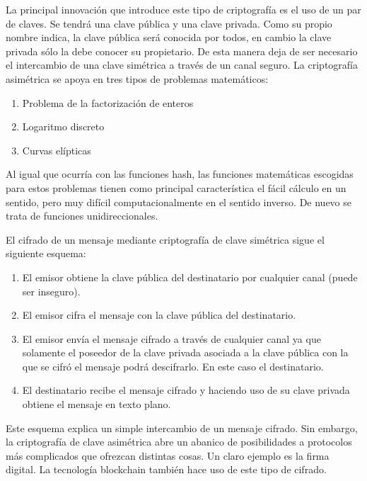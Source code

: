 La principal innovación que introduce este tipo de criptografía es el uso de un par de claves. Se tendrá una clave pública y una clave privada. Como su propio nombre indica, la clave pública será conocida por todos, en cambio la clave privada sólo la debe conocer su propietario. De esta manera deja de ser necesario el intercambio de una clave simétrica a través de un canal seguro.
La criptografía asimétrica se apoya en tres tipos de problemas matemáticos:

\begin{enumerate}
	\item Problema de la factorización de enteros
	\item Logaritmo discreto
	\item Curvas elípticas
\end{enumerate}

Al igual que ocurría con las funciones hash, las funciones matemáticas escogidas para estos problemas tienen como principal característica el fácil cálculo en un sentido, pero muy difícil computacionalmente en el sentido inverso. De nuevo se trata de funciones unidireccionales. \newline

El cifrado de un mensaje mediante criptografía de clave simétrica sigue el siguiente esquema:

\begin{enumerate}
	\item El emisor obtiene la clave pública del destinatario por cualquier canal (puede ser inseguro).
	\item El emisor cifra el mensaje con la clave pública del destinatario.
	\item El emisor envía el mensaje cifrado a través de cualquier canal ya que solamente el poseedor de la clave privada asociada a la clave pública con la que se cifró el mensaje podrá descifrarlo. En este caso el destinatario.
	\item El destinatario recibe el mensaje cifrado y haciendo uso de su clave privada obtiene el mensaje en texto plano.
\end{enumerate}

Este esquema explica un simple intercambio de un mensaje cifrado. Sin embargo, la criptografía de clave asimétrica abre un abanico de posibilidades a protocolos más complicados que ofrezcan distintas cosas. Un claro ejemplo es la firma digital. La tecnología blockchain también hace uso de este tipo de cifrado. \newline

